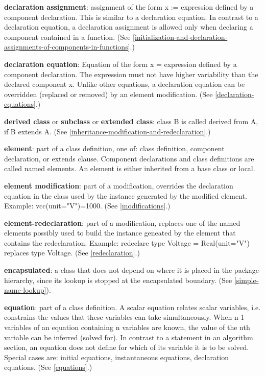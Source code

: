 \documentclass[../MLS.tex]{subfiles}
\begin{document}
\textbf{declaration assignment}: assignment of the form x := expression
defined by a component declaration. This is similar to a declaration
equation. In contrast to a declaration equation, a declaration
assignment is allowed only when declaring a component contained in a
function. (See \autoref{initialization-and-declaration-assignments-of-components-in-functions}.)

\textbf{declaration equation}: Equation of the form x = expression
defined by a component declaration. The expression must not have higher
variability than the declared component x. Unlike other equations, a
declaration equation can be overridden (replaced or removed) by an
element modification. (See \autoref{declaration-equations}.)

\textbf{derived class} or \textbf{subclass} or \textbf{extended class}:
class B is called derived from A, if B extends A. (See \autoref{inheritance-modification-and-redeclaration}.)

\textbf{element}: part of a class definition, one of: class definition,
component declaration, or extends clause. Component declarations and
class definitions are called named elements. An element is either
inherited from a base class or local.

\textbf{element modification}: part of a modification, overrides the
declaration equation in the class used by the instance generated by the
modified element. Example: vcc(unit="V")=1000. (See \autoref{modifications}.)

\textbf{element-redeclaration}: part of a modification, replaces one of
the named elements possibly used to build the instance geneated by the
element that contains the redeclaration. Example: redeclare type Voltage
= Real(unit="V") replaces type Voltage. (See \autoref{redeclaration}.)

\textbf{encapsulated}: a class that does not depend on where it is
placed in the package-hierarchy, since its lookup is stopped at the
encapsulated boundary. (See \autoref{simple-name-lookup}).

\textbf{equation}: part of a class definition. A scalar equation relates
scalar variables, i.e. constrains the values that these variables can
take simultaneously. When n-1 variables of an equation containing n
variables are known, the value of the nth variable can be inferred
(solved for). In contrast to a statement in an algorithm section, an
equation does not define for which of its variable it is to be solved.
Special cases are: initial equations, instantaneous equations,
declaration equations. (See \autoref{equations}.)
\end{document}
